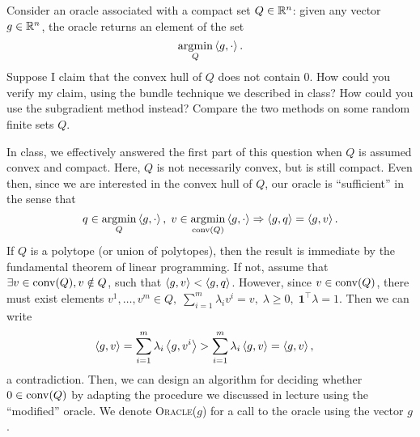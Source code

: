 \documentclass[10pt]{article}
\begin{document}
\begin{Exercise}
    Consider an oracle associated with a compact set $Q \in \mathbb{R}^n$: given any
    vector $g \in \mathbb{R}^n$, the oracle returns an element of the set
    \[
        \operatorname*{argmin}_{Q} \left\langle g, \cdot \right\rangle.
    \]
    Suppose I claim that the convex hull of $Q$ does not contain $0$. How could
    you verify my claim, using the bundle technique we described in class? How
    could you use the subgradient method instead? Compare the two methods on
    some random finite sets $Q$.
\end{Exercise}
\begin{Answer}
	In class, we effectively answered the first part of this question when $Q$
	is assumed convex and compact. Here, $Q$ is not necessarily convex, but is
	still compact. Even then, since we are interested in the convex hull
	of $Q$, our oracle is ``sufficient'' in the sense that
	\[
		q \in \operatorname*{argmin}_{Q} \left\langle g, \cdot \right\rangle, \; v \in \operatorname*{argmin}_{\mathrm{conv}(Q)} \left\langle g,
		\cdot \right\rangle \Rightarrow \left\langle g, q \right\rangle = \left\langle g, v \right\rangle.
	\]
	If $Q$ is a polytope (or union of polytopes), then the result is immediate
	by the fundamental theorem of linear programming. If not, assume that
	$\exists v \in \mathrm{conv}(Q), v \notin Q$, such that $\left\langle g, v \right\rangle < \left\langle g,
	q \right\rangle$. However, since $v \in \mathrm{conv}(Q)$, there must exist elements
	$v^1, \dots, v^m \in Q, \; \sum_{i=1}^m \lambda_i v^i = v, \; \lambda \geq
	0, \; \bm{1}^\top \lambda = 1$. Then we can write
	\begin{align*}
		\left\langle g, v \right\rangle &= \sum_{i=1}^{m} \lambda_i \left\langle g, v^i \right\rangle
		> \sum_{i=1}^m \lambda_i \left\langle g, v \right\rangle = \left\langle g, v \right\rangle,
	\end{align*}
	a contradiction. Then, we can design an algorithm for deciding whether $0
	\in \mathrm{conv}(Q)$ by adapting the procedure we discussed in lecture using
	the ``modified'' oracle. We denote \textsc{Oracle}($g$) for a call to the
	oracle using the vector $g$.


\end{Answer}
\end{document}
